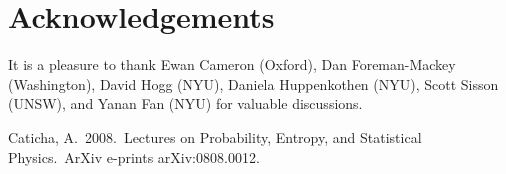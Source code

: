 \documentclass[a4paper, 11pt]{article}
\begin{document}
\section*{Acknowledgements}
It is a pleasure to thank Ewan Cameron (Oxford), Dan
Foreman-Mackey (Washington), David Hogg (NYU), Daniela Huppenkothen (NYU),
Scott Sisson (UNSW), and Yanan Fan (NYU) for valuable discussions.

\begin{thebibliography}{99}
 Caticha, A.\ 2008.\ Lectures 
on Probability, Entropy, and Statistical Physics.\ ArXiv e-prints 
arXiv:0808.0012. 

\end{thebibliography}
\end{document}
